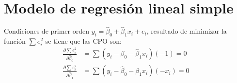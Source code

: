 \section[MRLS]{Modelo de regresión lineal simple}
\begin{frame}{Condiciones de primer orden}
	$y_i=\widehat{\beta}_0+\widehat{\beta}_1 x_i+e_i$, resultado de
	minimizar la función $\sum e_i^2$ se tiene que las CPO son: 
	\begin{align*}
		\frac{\partial\sum e_i^2}{\partial \widehat{\beta}_0} &= \sum(y_i-\beta_0-\widehat{\beta}_1 x_i)(-1)=0 \\
		\frac{\partial\sum e_i^2}{\partial \widehat{\beta}_1} &= \sum(y_i-\widehat{\beta}_0-\beta_1 x_i)(-x_i)=0
	\end{align*}
\end{frame}
